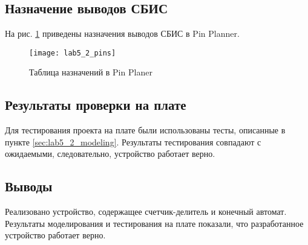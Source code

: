 \subsection{Назначение выводов СБИС}

На рис. \ref{fig:lab5_2_pins} приведены назначения выводов СБИС в Pin Planner.

\begin{figure}[H]
\begin{center}
	\texttt{[image: lab5\_2\_pins]}
	\caption{Таблица назначений в Pin Planer}
	\label{fig:lab5_2_pins}
\end{center}
\end{figure}

\subsection{Результаты проверки на плате}

Для тестирования проекта на плате были использованы тесты, описанные в пункте \ref{sec:lab5_2_modeling}. Результаты тестирования совпадают с ожидаемыми, следовательно, устройство работает верно.

\subsection{Выводы}

Реализовано устройство, содержащее счетчик-делитель и конечный автомат. Результаты моделирования и тестирования на плате показали, что разработанное устройство работает верно.

